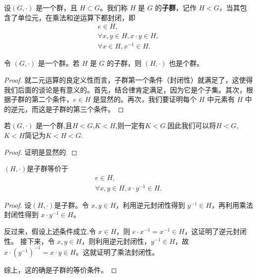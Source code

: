 \documentclass[../../main.tex]{subfiles}
\begin{document}
\begin{definition}[子群]
设$(G, \cdot)$ 是一个群，且 $H \subset G$。我们称 $H$ 是 $G$ 的\textbf{子群}，记作 $H < G$，当其包含了单位元，在乘法和逆运算下都封闭，即
\begin{gather*}
e \in H ,\\
\forall x, y \in H, x \cdot y \in H ,\\
\forall x \in H, x^{-1} \in H.
\end{gather*} 
\end{definition}

\begin{proposition}[子群也是群]
令 $(G, \cdot)$ 是一个群。若 $H$ 是 $G$ 的子群，则 $(H, \cdot)$ 也是个群。
\end{proposition}
\begin{proof}
就二元运算的良定义性而言，子群第一个条件（封闭性）就满足了，这使得我们后面的谈论是有意义的。首先，结合律肯定满足，因为它是个子集。其次，根据子群的第二个条件，$e \in H$ 是显然的。再次，我们要证明每个 $H$ 中元素有 $H$ 中的逆元，而这是子群的第三个条件。
\end{proof}

\begin{corollary}[子群的传递性]
若$(G, \cdot)$ 是一个群,且$H<G$,$K<H$,则一定有$K<G$.因此我们可以将$H<G$,$K<H$简记为$K<H<G$.
\end{corollary}
\begin{proof}
证明是显然的.
\end{proof}

\begin{proposition}[子群的等价条件]\label{proposition:子群的等价条件}
$(H,\cdot)$是子群等价于
\begin{gather*}
e \in H,\\
\forall x, y \in H, x \cdot y^{-1} \in H .
\end{gather*}
\end{proposition}
\begin{proof}
设$(H,\cdot)$是子群。令 $x, y \in H$，利用逆元封闭性得到 $y^{-1} \in H$，再利用乘法封闭性得到 $x \cdot y^{-1} \in H$。

反过来，假设上述条件成立.令 $x \in H$，则 $e \cdot x^{-1} = x^{-1} \in H$，这证明了逆元封闭性。
接下来，令 $x, y \in H$，则利用逆元封闭性，$y^{-1} \in H$，故 $x \cdot (y^{-1})^{-1} = x \cdot y \in H$。这就证明了乘法封闭性。

综上，这的确是子群的等价条件。
\end{proof}
\end{document}
